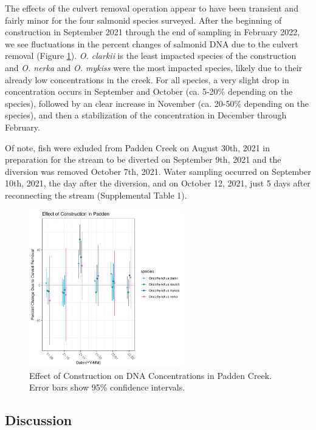 \documentclass[
]{article}
\begin{document}
The effects of the culvert removal operation appear to have been
transient and fairly minor for the four salmonid species surveyed. After
the beginning of construction in September 2021 through the end of
sampling in February 2022, we see fluctuations in the percent changes of
salmonid DNA due to the culvert removal (Figure \ref{fig:construction}).
\emph{O. clarkii} is the least impacted species of the construction and
\emph{O. nerka} and \emph{O. mykiss} were the most impacted species,
likely due to their already low concentrations in the creek. For all
species, a very slight drop in concentration occurs in September and
October (ca. 5-20\% depending on the species), followed by an clear
increase in November (ca. 20-50\% depending on the species), and then a
stabilization of the concentration in December through February.

Of note, fish were exluded from Padden Creek on August 30th, 2021 in
preparation for the stream to be diverted on September 9th, 2021 and the
diversion was removed October 7th, 2021. Water sampling occurred on
September 10th, 2021, the day after the diversion, and on October 12,
2021, just 5 days after reconnecting the stream (Supplemental Table 1).

\begin{figure}
\centering
\includegraphics[width=0.6\textwidth,height=\textheight]{../Output/Figures/20221129_Construction_effect.png}
\caption{Effect of Construction on DNA Concentrations in Padden Creek.
Error bars show 95\% confidence intervals.\label{fig:construction}}
\end{figure}

\hypertarget{discussion}{%
\subsection{Discussion}\label{discussion}}
\end{document}
